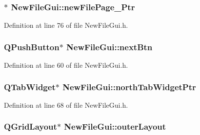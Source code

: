 \hypertarget{class_new_file_gui_a5b83d6fcae79fb5da3677848ec49647f}{
\subsubsection[{new\-File\-Page\-\_\-4\-Ptr}]{$\ast$ New\-File\-Gui\-::new\-File\-Page\-\_\-Ptr\hspace{0.3cm}{\ttfamily [private]}}}\label{class_new_file_gui_a5b83d6fcae79fb5da3677848ec49647f}


Definition at line 76 of file New\-File\-Gui.\-h.

\hypertarget{class_new_file_gui_ad1fa3cb3fa909bf6e71672497350f980}{
\subsubsection[{next\-Btn}]{\setlength{\rightskip}{0pt plus 5cm}Q\-Push\-Button$\ast$ New\-File\-Gui\-::next\-Btn\hspace{0.3cm}{\ttfamily [private]}}}\label{class_new_file_gui_ad1fa3cb3fa909bf6e71672497350f980}


Definition at line 60 of file New\-File\-Gui.\-h.

\hypertarget{class_new_file_gui_a101bfb66cbd62d340e55d632d07d7982}{
\subsubsection[{north\-Tab\-Widget\-Ptr}]{\setlength{\rightskip}{0pt plus 5cm}Q\-Tab\-Widget$\ast$ New\-File\-Gui\-::north\-Tab\-Widget\-Ptr\hspace{0.3cm}{\ttfamily [private]}}}\label{class_new_file_gui_a101bfb66cbd62d340e55d632d07d7982}


Definition at line 68 of file New\-File\-Gui.\-h.

\hypertarget{class_new_file_gui_ae5aa1370799c06f4368ef636279ab259}{
\subsubsection[{outer\-Layout}]{\setlength{\rightskip}{0pt plus 5cm}Q\-Grid\-Layout$\ast$ New\-File\-Gui\-::outer\-Layout\hspace{0.3cm}{\ttfamily [private]}}}\label{class_new_file_gui_ae5aa1370799c06f4368ef636279ab259}


